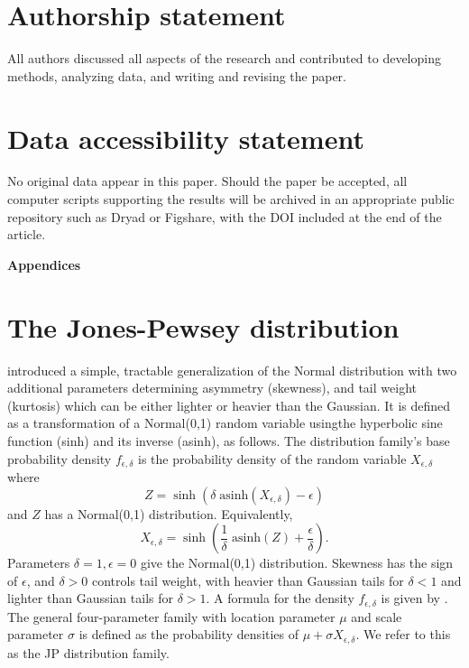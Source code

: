 \documentclass[12pt]{article}
\newcounter{box}
\newcommand{\be}{\begin{equation}}
\newcommand{\ee}{\end{equation}}
\begin{document}
\section{Authorship statement} 
All authors discussed all aspects of the research and contributed to developing methods, analyzing data, and writing and revising the paper.  

\section{Data accessibility statement}
No original data appear in this paper. Should the paper be accepted, all computer scripts supporting the results will be archived in an appropriate public repository such as Dryad or Figshare, with the DOI included at the end of the article.
	
\newpage 

%



\newpage 
\clearpage 
\setcounter{equation}{0}
\setcounter{figure}{0}
\setcounter{section}{0}
\setcounter{table}{0}
\setcounter{Box}{0}
\renewcommand{\theequation}{S.\arabic{equation}}
\renewcommand{\thetable}{S-\arabic{table}}
\renewcommand{\thefigure}{S-\arabic{figure}}
\renewcommand{\theBox}{S-\arabic{Box}}
\renewcommand{\thesection}{S.\arabic{section}}

\centerline{\Large{\textbf{Appendices}}}

\section{The Jones-Pewsey distribution} 
\citet{jones-pewsey-2009} introduced a simple, tractable generalization of the Normal distribution with two additional parameters determining  
asymmetry (skewness), and tail weight (kurtosis) which can be either lighter or heavier than the Gaussian. It is defined as a transformation
of a Normal(0,1) random variable usingthe hyperbolic sine function (sinh) and its inverse (asinh), as follows. The distribution family's base probability density  
$f_{\epsilon,\delta}$  is the probability density of the random variable $X_{\epsilon,\delta}$ where  
\be
Z = \sinh (\delta \; \mbox{asinh}(X_{\epsilon,\delta}) - \epsilon)
\label{eqn:JP1}
\ee
and $Z$ has a Normal(0,1) distribution.  Equivalently, 
\be
X_{\epsilon,\delta} = \sinh \left( \frac{1}{\delta} \; \mbox{asinh}(Z) + \frac{\epsilon}{\delta}\right).
\label{eqn:JP2}
\ee
Parameters $\delta=1, \epsilon=0$ give the Normal(0,1) distribution. Skewness has the sign of $\epsilon$, and
$\delta > 0$ controls tail weight, with heavier than Gaussian tails for $\delta<1$ and lighter than Gaussian tails for $\delta > 1$. 
A formula for the density $f_{\epsilon,\delta}$ is given by \citet[][eqn. 2]{jones-pewsey-2009}. 
The general four-parameter family with location parameter $\mu$ and scale parameter $\sigma$ is defined as the probability densities 
of $\mu + \sigma X_{\epsilon, \delta}$. We refer to this as the JP distribution family. 
\end{document}
